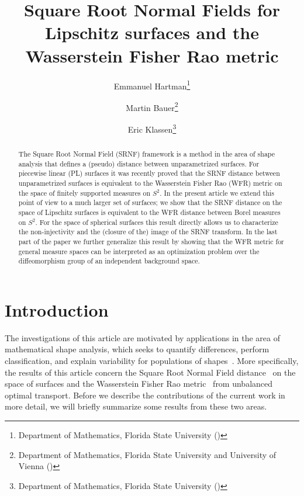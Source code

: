 \documentclass[final,hidelinks,onefignum,onetabnum]{siamart220329}
\title{Square Root Normal Fields for Lipschitz surfaces and the Wasserstein Fisher Rao metric
}
\author{Emmanuel Hartman\thanks{Department of Mathematics, Florida State University (\email{ehartman@fsu.edu})}\and Martin Bauer\thanks{Department of Mathematics, Florida State University and University of Vienna (\email{bauer@math.fsu.edu})}\and  Eric Klassen\thanks{Department of Mathematics, Florida State University (\email{klassen@math.fsu.edu})}}
\begin{document}
\maketitle
\begin{abstract}
The Square Root Normal Field (SRNF) framework is a method in the area of shape analysis that defines a (pseudo) distance between unparametrized  surfaces. For piecewise linear (PL) surfaces it was recently proved that the SRNF distance between unparametrized  surfaces is equivalent to the Wasserstein Fisher Rao (WFR) metric on the space of finitely supported measures on $S^2$. In the present article we extend this point of view to a much larger set of surfaces; we show that the SRNF distance on the space of Lipschitz surfaces is equivalent to the WFR distance between Borel measures on $S^2$. For the space of spherical surfaces this result directly allows us to characterize the non-injectivity and the (closure of the) image of the SRNF transform. In the last part of the paper we further generalize this result by showing that the WFR metric for general measure spaces can be interpreted as an  optimization problem over the diffeomorphism group of an independent background space. 
\end{abstract}
\tableofcontents



\section{Introduction}
The investigations of this article are motivated by applications in the area of mathematical shape analysis, which seeks to quantify differences, perform classification, and explain variability for populations of shapes~\cite{younes2010shapes,srivastava2016functional,dryden2016statistical,marron2014overview}. More specifically, the results of this article concern the Square Root Normal Field distance~\cite{jermyn2017elastic} on the space of surfaces and the Wasserstein Fisher Rao metric~\cite{chizat2018interpolating,liero2018optimal} from unbalanced optimal transport. Before we describe the contributions of the current work in more detail, we will briefly summarize some results from these two areas.
\end{document}
